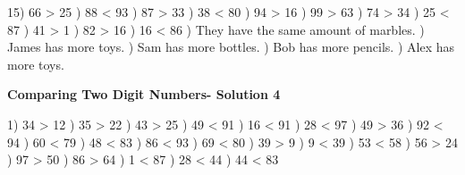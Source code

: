 \documentclass{article}%
\begin{document}
15) 66 > 25%
) 88 < 93%
) 87 > 33%
) 38 < 80%
) 94 > 16%
) 99 > 63%
) 74 > 34%
) 25 < 87%
) 41 > 1%
) 82 > 16%
) 16 < 86%
) They have the same amount of marbles.%
) James has more toys.%
) Sam has more bottles.%
) Bob has more pencils.%
) Alex has more toys.%
\newline%
\newpage%
\large%
\begin{center}%
\textbf{Comparing Two Digit Numbers- Solution 4}%
\newline%
\end{center} \normalsize%
1) 34 > 12%
) 35 > 22%
) 43 > 25%
) 49 < 91%
) 16 < 91%
) 28 < 97%
) 49 > 36%
) 92 < 94%
) 60 < 79%
) 48 < 83%
) 86 < 93%
) 69 < 80%
) 39 > 9%
) 9 < 39%
) 53 < 58%
) 56 > 24%
) 97 > 50%
) 86 > 64%
) 1 < 87%
) 28 < 44%
) 44 < 83%
\newline%
\end{document}

